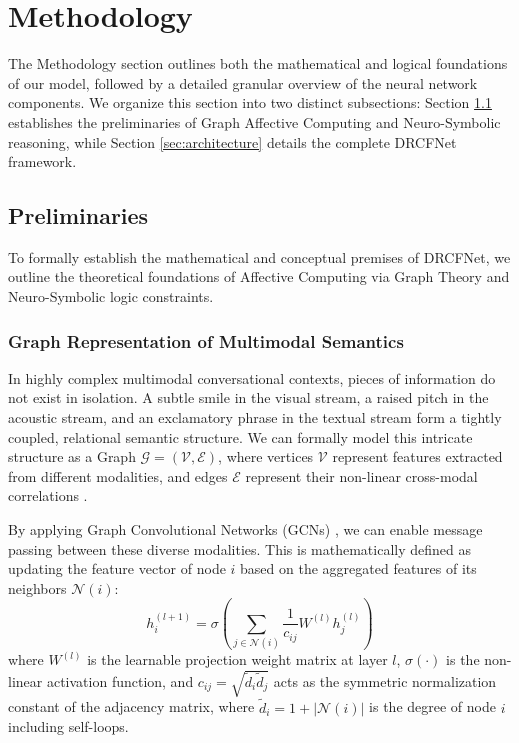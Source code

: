\documentclass[sn-mathphys,Numbered]{sn-jnl}
\theoremstyle{thmstyleone}
\theoremstyle{thmstyletwo}
\theoremstyle{thmstylethree}
\begin{document}
\section{Methodology}\label{sec:method}

The Methodology section outlines both the mathematical and logical foundations of our model, followed by a detailed granular overview of the neural network components. We organize this section into two distinct subsections: Section \ref{sec:prelims} establishes the preliminaries of Graph Affective Computing and Neuro-Symbolic reasoning, while Section \ref{sec:architecture} details the complete DRCFNet framework.

\subsection{Preliminaries}\label{sec:prelims}
To formally establish the mathematical and conceptual premises of DRCFNet, we outline the theoretical foundations of Affective Computing via Graph Theory and Neuro-Symbolic logic constraints.

\subsubsection{Graph Representation of Multimodal Semantics}
In highly complex multimodal conversational contexts, pieces of information do not exist in isolation. A subtle smile in the visual stream, a raised pitch in the acoustic stream, and an exclamatory phrase in the textual stream form a tightly coupled, relational semantic structure. We can formally model this intricate structure as a Graph $\mathcal{G} = (\mathcal{V}, \mathcal{E})$, where vertices $\mathcal{V}$ represent features extracted from different modalities, and edges $\mathcal{E}$ represent their non-linear cross-modal correlations \cite{joshi2022cogmen}. 

By applying Graph Convolutional Networks (GCNs) \cite{kipf2016semi}, we can enable message passing between these diverse modalities. This is mathematically defined as updating the feature vector of node $i$ based on the aggregated features of its neighbors $\mathcal{N}(i)$:
\begin{equation}
    h^{(l+1)}_{i} = \sigma \left( \sum_{j \in \mathcal{N}(i)} \frac{1}{c_{ij}} W^{(l)} h^{(l)}_{j} \right)
\end{equation}
where $W^{(l)}$ is the learnable projection weight matrix at layer $l$, $\sigma(\cdot)$ is the non-linear activation function, and $c_{ij} = \sqrt{\tilde{d}_i \tilde{d}_j}$ acts as the symmetric normalization constant of the adjacency matrix, where $\tilde{d}_i = 1 + |\mathcal{N}(i)|$ is the degree of node $i$ including self-loops.
\end{document}
